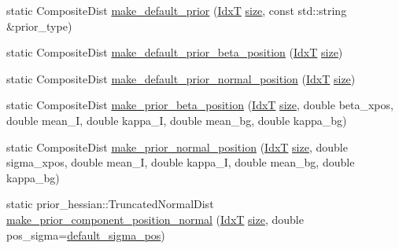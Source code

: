 \begin{DoxyCompactItemize}
\item 
static Composite\+Dist \hyperlink{classmappel_1_1Gauss1DModel_ab9aeff0d5e4f065e81b1d49183ca3fcb}{make\+\_\+default\+\_\+prior} (\hyperlink{namespacemappel_ab17ec0f30b61ece292439d7ece81d3a8}{IdxT} \hyperlink{classmappel_1_1ImageFormat1DBase_a8941b4d028e4dd881146a7c1b9039bb1}{size}, const std\+::string \&prior\+\_\+type)
\item 
static Composite\+Dist \hyperlink{classmappel_1_1Gauss1DModel_a539665592706f1d18966ce7fff974f92}{make\+\_\+default\+\_\+prior\+\_\+beta\+\_\+position} (\hyperlink{namespacemappel_ab17ec0f30b61ece292439d7ece81d3a8}{IdxT} \hyperlink{classmappel_1_1ImageFormat1DBase_a8941b4d028e4dd881146a7c1b9039bb1}{size})
\item 
static Composite\+Dist \hyperlink{classmappel_1_1Gauss1DModel_a456b984f2309b0d5a72516361e4e18d0}{make\+\_\+default\+\_\+prior\+\_\+normal\+\_\+position} (\hyperlink{namespacemappel_ab17ec0f30b61ece292439d7ece81d3a8}{IdxT} \hyperlink{classmappel_1_1ImageFormat1DBase_a8941b4d028e4dd881146a7c1b9039bb1}{size})
\item 
static Composite\+Dist \hyperlink{classmappel_1_1Gauss1DModel_a808fde22a0fb00140b4ba60e7df685eb}{make\+\_\+prior\+\_\+beta\+\_\+position} (\hyperlink{namespacemappel_ab17ec0f30b61ece292439d7ece81d3a8}{IdxT} \hyperlink{classmappel_1_1ImageFormat1DBase_a8941b4d028e4dd881146a7c1b9039bb1}{size}, double beta\+\_\+xpos, double mean\+\_\+I, double kappa\+\_\+I, double mean\+\_\+bg, double kappa\+\_\+bg)
\item 
static Composite\+Dist \hyperlink{classmappel_1_1Gauss1DModel_ab4fc9aafd94b2dd6532ef71f2ea47619}{make\+\_\+prior\+\_\+normal\+\_\+position} (\hyperlink{namespacemappel_ab17ec0f30b61ece292439d7ece81d3a8}{IdxT} \hyperlink{classmappel_1_1ImageFormat1DBase_a8941b4d028e4dd881146a7c1b9039bb1}{size}, double sigma\+\_\+xpos, double mean\+\_\+I, double kappa\+\_\+I, double mean\+\_\+bg, double kappa\+\_\+bg)
\item 
static prior\+\_\+hessian\+::\+Truncated\+Normal\+Dist \hyperlink{classmappel_1_1PointEmitterModel_ab99350cf74097c558f7a93b79e7a44c3}{make\+\_\+prior\+\_\+component\+\_\+position\+\_\+normal} (\hyperlink{namespacemappel_ab17ec0f30b61ece292439d7ece81d3a8}{IdxT} \hyperlink{classmappel_1_1ImageFormat1DBase_a8941b4d028e4dd881146a7c1b9039bb1}{size}, double pos\+\_\+sigma=\hyperlink{classmappel_1_1PointEmitterModel_aa98a73b9e3937c00b07596d3928df3ca}{default\+\_\+sigma\+\_\+pos})
\item 

\end{DoxyCompactItemize}
